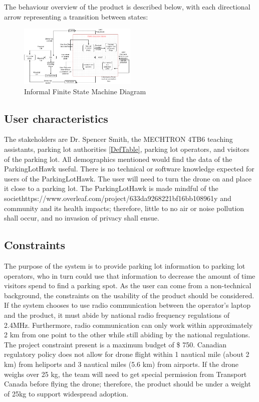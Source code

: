 \documentclass{article}
\begin{document}
The behaviour overview of the product is described below, with each directional arrow representing a transition between states:
\begin{figure}[h!]
  \begin{center} 
  \caption{Informal Finite State Machine Diagram } 
  \label{InfFSM}
 
        \includegraphics[width=0.5\textwidth]{InformalFSM.png}
  \end{center}
\end{figure}

\subsection{User characteristics}
The stakeholders are Dr. Spencer Smith, the MECHTRON 4TB6 teaching assistants, parking lot authorities \ref{DefTable}, parking lot operators, and visitors of the parking lot. All demographics mentioned would find the data of the ParkingLotHawk useful. There is no technical or software knowledge expected for users of the ParkingLotHawk. The user will need to turn the drone on and place it close to a parking lot.  The ParkingLotHawk is made mindful of the societhttps://www.overleaf.com/project/633da9268221bf16bb108961y and community and its health impacts; therefore, little to no air or noise pollution shall occur, and no invasion of privacy shall ensue.
\subsection{Constraints}
\label{sec:Constraints}
The purpose of the system is to provide parking lot information to parking lot operators, who in turn could use that information to decrease the amount of time visitors spend to find a parking spot. As the user can come from a non-technical background, the constraints on the usability of the product should be considered. If the system chooses to use radio communication between the operator's laptop and the product, it must abide by national radio frequency regulations of 2.4MHz. Furthermore, radio communication can only work within approximately 2 km from one point to the other while still abiding by the national regulations. The project constraint present is a maximum budget of \$ 750.  Canadian regulatory policy does not allow for drone flight within 1 nautical mile (about 2 km) from heliports and 3 nautical miles (5.6 km) from airports\cite{canada_flying_2020}. If the drone weighs over 25 kg, the team will need to get special permission from Transport Canada before flying the drone\cite{canada_find_2021}; therefore, the product should be under a weight of 25kg to support widespread adoption.
\end{document}
